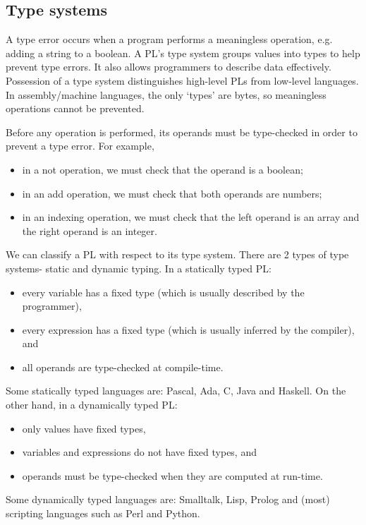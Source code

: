 \documentclass[a4paper, openany]{memoir}
\begin{document}
\subsection{Type systems}
A type error occurs when a program performs a meaningless operation, e.g. adding a string to a boolean. A PL's type system groups values into types to help prevent type errors. It also allows programmers to describe data effectively. Possession of a type system distinguishes high-level PLs from low-level languages. In assembly/machine languages, the only `types' are bytes, so meaningless operations cannot be prevented.

Before any operation is performed, its operands must be type-checked in order to prevent a type error. For example,
\begin{itemize}
    \item in a not operation, we must check that the operand is a boolean;
    \item in an add operation, we must check that both operands are numbers;
    \item in an indexing operation, we must check that the left operand is an array and the right operand is an integer.
\end{itemize}

We can classify a PL with respect to its type system. There are 2 types of type systems- static and dynamic typing. In a statically typed PL:
\begin{itemize}
    \item every variable has a fixed type (which is usually described by the programmer), 
    \item every expression has a fixed type (which is usually inferred by the compiler), and
    \item all operands are type-checked at compile-time.
\end{itemize}
Some statically typed languages are: Pascal, Ada, C, Java and Haskell. On the other hand, in a dynamically typed PL:
\begin{itemize}
    \item only values have fixed types,
    \item variables and expressions do not have fixed types, and
    \item operands must be type-checked when they are computed at run-time.
\end{itemize}
Some dynamically typed languages are: Smalltalk, Lisp, Prolog and (most) scripting languages such as Perl and Python.
\end{document}
